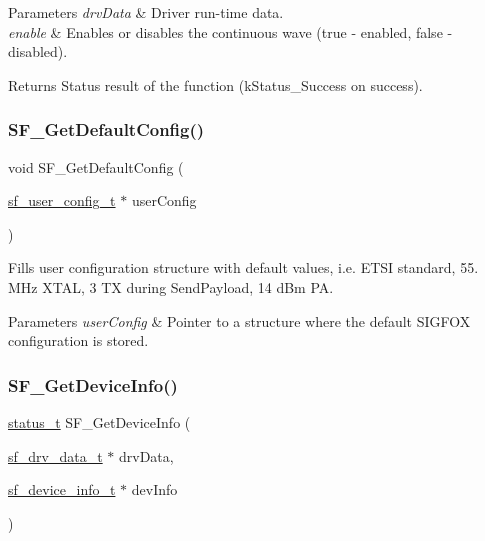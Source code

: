\begin{DoxyParams}{Parameters}
{\em drv\+Data} & Driver run-\/time data. \\
\hline
{\em enable} & Enables or disables the continuous wave (true -\/ enabled, false -\/ disabled).\\
\hline
\end{DoxyParams}
\begin{DoxyReturn}{Returns}
Status result of the function (k\+Status\+\_\+\+Success on success). 
\end{DoxyReturn}
\mbox{\label{group__sf__functions__group_gaeac5315858b24e339879e28d7578337d}} 
\subsubsection{\texorpdfstring{SF\_GetDefaultConfig()}{SF\_GetDefaultConfig()}}
{\footnotesize\ttfamily void S\+F\+\_\+\+Get\+Default\+Config (\begin{DoxyParamCaption}\item[{\mbox{\hyperlink{structsf__user__config__t}{sf\+\_\+user\+\_\+config\+\_\+t}} $\ast$}]{user\+Config }\end{DoxyParamCaption})}



Fills user configuration structure with default values, i.\+e. E\+T\+SI standard, 55. M\+Hz X\+T\+AL, 3 TX during Send\+Payload, 14 d\+Bm PA. 


\begin{DoxyParams}{Parameters}
{\em user\+Config} & Pointer to a structure where the default S\+I\+G\+F\+OX configuration is stored. \\
\hline
\end{DoxyParams}
\mbox{\label{group__sf__functions__group_gac2350dad3fd06accd548ec1e4c761239}} 
\subsubsection{\texorpdfstring{SF\_GetDeviceInfo()}{SF\_GetDeviceInfo()}}
{\footnotesize\ttfamily \mbox{\hyperlink{group__ksdk__common_gaaabdaf7ee58ca7269bd4bf24efcde092}{status\+\_\+t}} S\+F\+\_\+\+Get\+Device\+Info (\begin{DoxyParamCaption}\item[{\mbox{\hyperlink{structsf__drv__data__t}{sf\+\_\+drv\+\_\+data\+\_\+t}} $\ast$}]{drv\+Data,  }\item[{\mbox{\hyperlink{structsf__device__info__t}{sf\+\_\+device\+\_\+info\+\_\+t}} $\ast$}]{dev\+Info }\end{DoxyParamCaption})}



